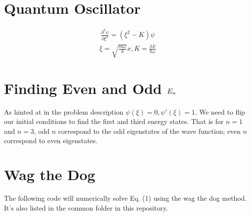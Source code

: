 \documentclass[letterpaper,10pt,english]{jupyterBook}
\begin{document}
\chapter{Quantum Oscillator}
\label{\detokenize{2.56:quantum-oscillator}}\begin{equation*}
\begin{split}
\frac{\partial^2 \psi}{\partial \xi^2} = (\xi^2 - K)\psi
\end{split}
\end{equation*}\begin{equation*}
\begin{split}
\xi = \sqrt{\frac{m\omega}{\hbar}}x, K=\frac{2E}{\hbar\omega}
\end{split}
\end{equation*}

\chapter{Finding Even and Odd \protect\(E_n\protect\)}
\label{\detokenize{2.56:finding-even-and-odd-e-n}}
\sphinxAtStartPar
As hinted at in the problem description  \(\psi(\xi)=0, \psi'(\xi)=1\). We need to flip our initial conditions to find the first and third energy states. That is for \(n=1\) and \(n=3\), odd \(n\) correspond to the odd eigenstates of the wave function; even \(n\) correspond to even eigenstates.


\chapter{Wag the Dog}
\label{\detokenize{2.56:wag-the-dog}}
\sphinxAtStartPar
The following code will numerically solve Eq. (1) using the wag the dog method. It’s also listed in the common folder in this repository.
\end{document}
